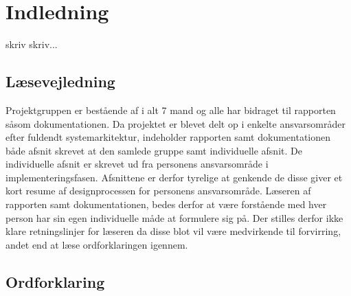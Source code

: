 \chapter{Indledning}
\label{ch:Indledning}

skriv skriv...

\section{Læsevejledning}
Projektgruppen er bestående af i alt 7 mand og alle har bidraget til rapporten såsom dokumentationen. Da projektet er blevet delt op i enkelte ansvarsområder efter fuldendt systemarkitektur, indeholder rapporten samt dokumentationen både afsnit skrevet at den samlede gruppe samt individuelle afsnit. De individuelle afsnit er skrevet ud fra personens ansvarsområde i implementeringsfasen. Afsnittene er derfor tyrelige at genkende de disse giver et kort resume af designprocessen for personens ansvarsområde. Læseren af rapporten samt dokumentationen, bedes derfor at være forstående med hver person har sin egen individuelle måde at formulere sig på. Der stilles derfor ikke klare retningslinjer for læseren da disse blot vil være medvirkende til forvirring, andet end at læse ordforklaringen igennem. 

\clearpage

\section{Ordforklaring}

